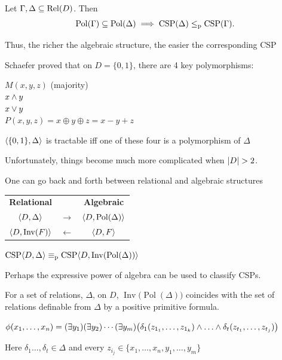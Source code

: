 \documentclass[12pt,xcolor=dvipsnames%
   ]{beamer}
\DeclareMathOperator{\Rel}{Rel}
\newcommand{\bigpause}{\pause\bigskip}
\DeclareMathOperator{\CSP}{CSP}
\DeclareMathOperator{\Pol}{Pol}
\DeclareMathOperator{\Inv}{Inv}
\renewcommand{\.}{\cdot}
\newcommand{\reduc}{\leq_{\text{\textnormal{p}}}}
\newcommand{\equivp}{\equiv_{\text{\textnormal{p}}}}
\let\origtextbf=\textbf
\let\emph=\alert
\renewcommand{\textbf}[1]{{\usebeamercolor[fg]{example text}%
     \origtextbf{#1}}}
\begin{document}
\begin{frame}
  \begin{theorem}
    Let $\Gamma, \Delta \sseq \Rel(D)$. Then
    \begin{equation*}
      \Pol(\Gamma) \sseq \Pol(\Delta) \implies \CSP(\Delta) \reduc
      \CSP(\Gamma). 
    \end{equation*}
  \end{theorem}

\pause
Thus, the richer the algebraic structure, the easier the corresponding CSP
\end{frame}

\begin{frame}
Schaefer proved that on $D=\{0,1\}$, there are 4 key polymorphisms:

\begin{center}
$M(x,y,z)$ (majority)\\
$x\wedge y$\\
$x\vee y$\\
$P(x,y,z) =x\oplus y \oplus z = x-y+z$
\end{center}

\bigskip
$\langle\{0,1\},\Delta\rangle$ is tractable iff one of these four is a polymorphism of $\Delta$

\bigpause
Unfortunately, things become much more complicated when $\card{D}>2$.
\end{frame}


\begin{frame}
  One can go back and forth between relational and algebraic structures

  \begin{center}
    \begin{tabular}{ccc}
      \origtextbf{Relational} & &\origtextbf{Algebraic}  \\
      $\langle D,\Delta\rangle$ & $\longrightarrow$ & $\<D,\Pol(\Delta)\>$ \\[2pt]
      $\<D, \Inv(F)\>$ & $\longleftarrow$ &$\langle D,F\rangle$
    \end{tabular}
  \end{center}

  $\CSP\<D,\Delta\> \equivp \CSP\<D,\Inv(\Pol(\Delta))\>$

  \bigpause
  Perhaps the expressive power of algebra can be used to classify CSPs.

  \end{frame}

\begin{frame}
For a set of relations, $\Delta$, on $D$, $\Inv\bigl(\Pol(\Delta)\bigr)$ coincides with the set of relations definable from $\Delta$ by a \emph{positive primitive formula}.

\pause
$\phi(x_1,\dots,x_n)=(\exists y_1)(\exists y_2)\cdots(\exists y_m)\bigl(\delta_1(z_{1_1},\dots,z_{1_k}) \meet \dots \meet \delta_t(z_{t_1},\dots,z_{t_j})\bigr)$

Here $\delta_1\dots,\delta_t \in \Delta$ and every $z_{i_j} \in \{x_1,\dots,x_n,y_1,\dots,y_m\}$
\end{frame}
\end{document}
